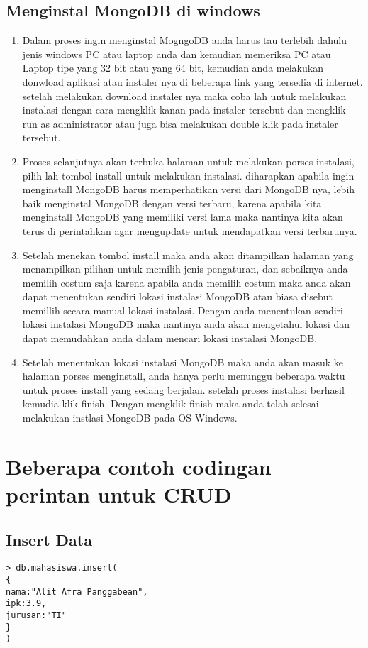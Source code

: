 {\subsection {Menginstal MongoDB di windows}
\begin {enumerate}
\item
	Dalam proses ingin menginstal MogngoDB anda harus tau terlebih dahulu jenis windows PC atau laptop anda dan kemudian memeriksa PC atau Laptop tipe yang 32 bit atau yang 64 bit, kemudian anda melakukan donwload aplikasi atau instaler nya di beberapa link yang tersedia di internet. setelah melakukan download instaler nya maka coba lah untuk melakukan instalasi dengan cara mengklik kanan pada instaler tersebut dan mengklik run as administrator atau juga bisa melakukan double klik pada instaler tersebut.
\item
	Proses selanjutnya akan terbuka halaman untuk melakukan porses instalasi, pilih lah tombol install untuk melakukan instalasi. diharapkan apabila ingin menginstall MongoDB harus memperhatikan versi dari MongoDB nya, lebih baik menginstal MongoDB dengan versi terbaru, karena apabila kita menginstall MongoDB yang memiliki versi lama maka nantinya kita akan terus di perintahkan agar mengupdate untuk mendapatkan versi terbarunya.
\item
	Setelah menekan tombol install maka anda akan ditampilkan halaman yang menampilkan pilihan untuk memilih jenis pengaturan, dan sebaiknya anda memilih costum saja karena apabila anda memilih costum maka anda akan dapat menentukan sendiri lokasi instalasi MongoDB atau biasa disebut memillih secara manual lokasi instalasi. Dengan anda menentukan sendiri lokasi instalasi MongoDB maka nantinya anda akan mengetahui lokasi dan dapat memudahkan anda dalam mencari lokasi instalasi MongoDB.
\item
	Setelah menentukan lokasi instalasi MongoDB maka anda akan masuk ke halaman porses menginstall, anda hanya perlu menunggu beberapa waktu untuk proses install yang sedang berjalan. setelah proses instalasi berhasil kemudia klik finish. Dengan mengklik finish maka anda telah selesai melakukan instlasi MongoDB pada OS Windows.
\end {enumerate}


\section {Beberapa contoh codingan perintan untuk CRUD}
\subsection {Insert Data}
\begin{verbatim} 
> db.mahasiswa.insert(
{
nama:"Alit Afra Panggabean", 
ipk:3.9,
jurusan:"TI"
}
)


\end{verbatim}}
